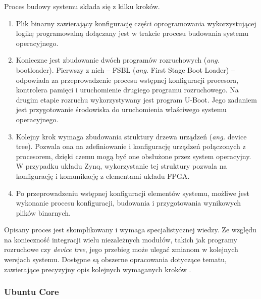 Proces budowy systemu składa się z kilku kroków. 
\begin{enumerate}
\item Plik binarny zawierający konfigurację części oprogramowania wykorzystującej logikę programowalną dołączany jest w trakcie procesu budowania systemu operacyjnego.

\item Konieczne jest zbudowanie dwóch programów rozruchowych (\emph{ang.} bootloader).
Pierwszy z nich -- FSBL (\emph{ang.} First Stage Boot Loader) -- odpowiada za przeprowadzenie procesu wstępnej konfiguracji procesora, kontrolera pamięci i uruchomienie drugiego programu rozruchowego. 
Na drugim etapie rozruchu wykorzystywany jest program U-Boot. 
Jego zadaniem jest przygotowanie środowiska do uruchomienia właściwego systemu operacyjnego.

\item Kolejny krok wymaga zbudowania struktury drzewa urządzeń (\emph{ang.} device tree). 
Pozwala ona na zdefiniowanie i konfigurację urządzeń połączonych z procesorem, dzięki czemu mogą być one obsłużone przez system operacyjny. 
W przypadku układu Zynq, wykorzystanie tej struktury pozwala na konfigurację i komunikację z elementami układu FPGA.

\item Po przeprowadzeniu wstępnej konfiguracji elementów systemu, możliwe jest wykonanie procesu konfiguracji, budowania i przygotowania wynikowych plików binarnych.
\end{enumerate}
Opisany proces jest skomplikowany i wymaga specjalistycznej wiedzy. Ze względu na konieczność integracji wielu niezależnych modułów, takich jak programy rozruchowe czy \emph{device tree}, jego przebieg może ulegać zmianom w kolejnych wersjach systemu.
Dostępne są obszerne opracowania dotyczące tematu, zawierające precyzyjny opis kolejnych wymaganych kroków \cite{zybo-zynq-getting-started,zybo-stock-linux,xilinx-build-kernel}.

\subsubsection{Ubuntu Core}

